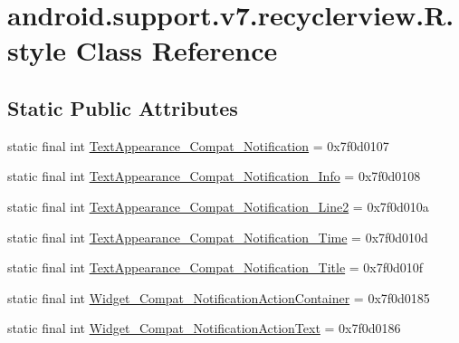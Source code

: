 \hypertarget{classandroid_1_1support_1_1v7_1_1recyclerview_1_1R_1_1style}{}\section{android.\+support.\+v7.\+recyclerview.\+R.\+style Class Reference}
\label{classandroid_1_1support_1_1v7_1_1recyclerview_1_1R_1_1style}
\subsection*{Static Public Attributes}
\begin{DoxyCompactItemize}
\item 
static final int \mbox{\hyperlink{classandroid_1_1support_1_1v7_1_1recyclerview_1_1R_1_1style_a337bde64ff42282b58423091ecdd204f}{Text\+Appearance\+\_\+\+Compat\+\_\+\+Notification}} = 0x7f0d0107
\item 
static final int \mbox{\hyperlink{classandroid_1_1support_1_1v7_1_1recyclerview_1_1R_1_1style_ad4b4114dfa46e18ceb35e579c2f2354a}{Text\+Appearance\+\_\+\+Compat\+\_\+\+Notification\+\_\+\+Info}} = 0x7f0d0108
\item 
static final int \mbox{\hyperlink{classandroid_1_1support_1_1v7_1_1recyclerview_1_1R_1_1style_a520bcc098762ac1db8fe7e6e8f7bfd0f}{Text\+Appearance\+\_\+\+Compat\+\_\+\+Notification\+\_\+\+Line2}} = 0x7f0d010a
\item 
static final int \mbox{\hyperlink{classandroid_1_1support_1_1v7_1_1recyclerview_1_1R_1_1style_a2ff1107d17a096b297c74dcf138d26b0}{Text\+Appearance\+\_\+\+Compat\+\_\+\+Notification\+\_\+\+Time}} = 0x7f0d010d
\item 
static final int \mbox{\hyperlink{classandroid_1_1support_1_1v7_1_1recyclerview_1_1R_1_1style_ac96b6a57ff1ba29bb1b8410d41940117}{Text\+Appearance\+\_\+\+Compat\+\_\+\+Notification\+\_\+\+Title}} = 0x7f0d010f
\item 
static final int \mbox{\hyperlink{classandroid_1_1support_1_1v7_1_1recyclerview_1_1R_1_1style_ac051560c049d71a142258af4e545858e}{Widget\+\_\+\+Compat\+\_\+\+Notification\+Action\+Container}} = 0x7f0d0185
\item 
static final int \mbox{\hyperlink{classandroid_1_1support_1_1v7_1_1recyclerview_1_1R_1_1style_a656830361a44335514a2aa300f895e2f}{Widget\+\_\+\+Compat\+\_\+\+Notification\+Action\+Text}} = 0x7f0d0186
\end{DoxyCompactItemize}


